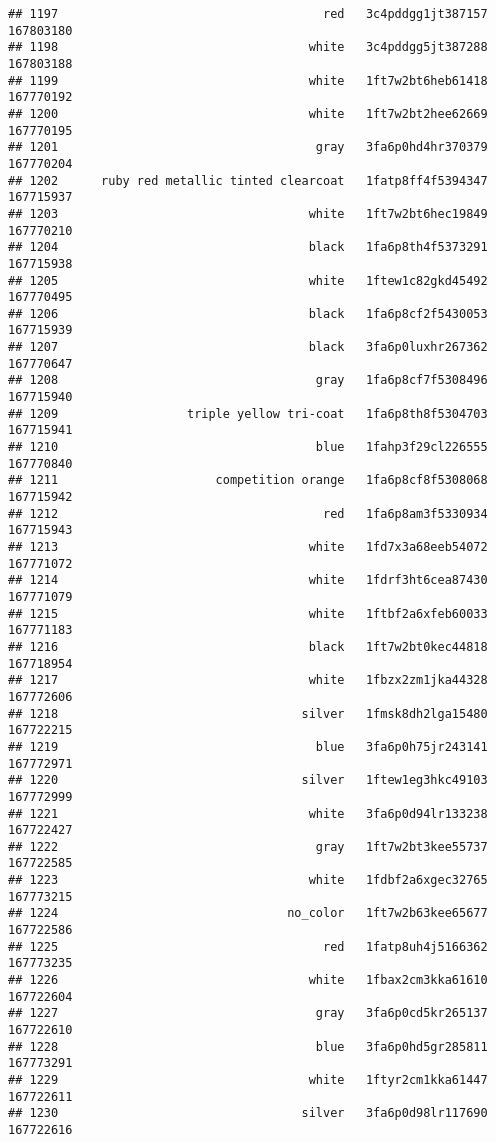 \documentclass[
]{article}
\begin{document}
\begin{verbatim}
## 1197                                     red   3c4pddgg1jt387157 167803180
## 1198                                   white   3c4pddgg5jt387288 167803188
## 1199                                   white   1ft7w2bt6heb61418 167770192
## 1200                                   white   1ft7w2bt2hee62669 167770195
## 1201                                    gray   3fa6p0hd4hr370379 167770204
## 1202      ruby red metallic tinted clearcoat   1fatp8ff4f5394347 167715937
## 1203                                   white   1ft7w2bt6hec19849 167770210
## 1204                                   black   1fa6p8th4f5373291 167715938
## 1205                                   white   1ftew1c82gkd45492 167770495
## 1206                                   black   1fa6p8cf2f5430053 167715939
## 1207                                   black   3fa6p0luxhr267362 167770647
## 1208                                    gray   1fa6p8cf7f5308496 167715940
## 1209                  triple yellow tri-coat   1fa6p8th8f5304703 167715941
## 1210                                    blue   1fahp3f29cl226555 167770840
## 1211                      competition orange   1fa6p8cf8f5308068 167715942
## 1212                                     red   1fa6p8am3f5330934 167715943
## 1213                                   white   1fd7x3a68eeb54072 167771072
## 1214                                   white   1fdrf3ht6cea87430 167771079
## 1215                                   white   1ftbf2a6xfeb60033 167771183
## 1216                                   black   1ft7w2bt0kec44818 167718954
## 1217                                   white   1fbzx2zm1jka44328 167772606
## 1218                                  silver   1fmsk8dh2lga15480 167722215
## 1219                                    blue   3fa6p0h75jr243141 167772971
## 1220                                  silver   1ftew1eg3hkc49103 167772999
## 1221                                   white   3fa6p0d94lr133238 167722427
## 1222                                    gray   1ft7w2bt3kee55737 167722585
## 1223                                   white   1fdbf2a6xgec32765 167773215
## 1224                                no_color   1ft7w2b63kee65677 167722586
## 1225                                     red   1fatp8uh4j5166362 167773235
## 1226                                   white   1fbax2cm3kka61610 167722604
## 1227                                    gray   3fa6p0cd5kr265137 167722610
## 1228                                    blue   3fa6p0hd5gr285811 167773291
## 1229                                   white   1ftyr2cm1kka61447 167722611
## 1230                                  silver   3fa6p0d98lr117690 167722616

\end{verbatim}
\end{document}

